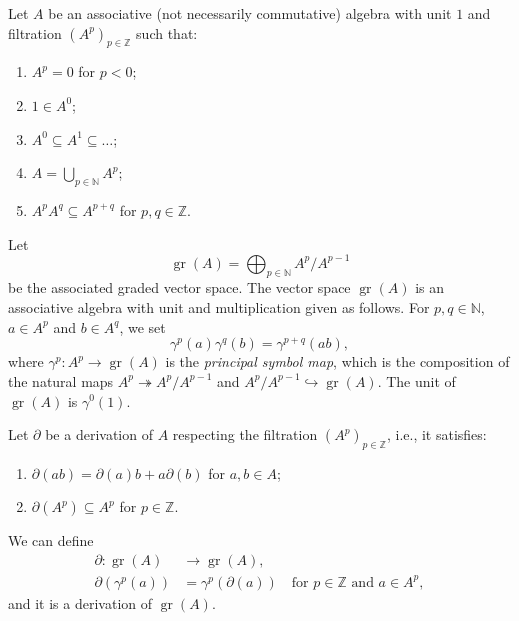 \documentclass[a4paper, 12pt, reqno]{amsart}
\theoremstyle{remark}
\DeclareMathOperator{\gr}{gr}
\begin{document}
Let $A$ be an associative (not necessarily commutative) algebra with unit $1$ and filtration $(A^p)_{p \in \mathbb{Z}}$ such that:
\begin{enumerate}
\item $A^p = 0$ for $p < 0$;
\item $1 \in A^0$;
\item $A^0 \subseteq A^1 \subseteq \dots$;
\item $A = \bigcup_{p \in \mathbb{N}}A^p$;
\item $A^pA^q \subseteq A^{p + q}$ for $p, q \in \mathbb{Z}$.
\end{enumerate}
Let
\begin{equation*}
  \gr(A) = \bigoplus_{p \in \mathbb{N}}A^p/A^{p - 1}
\end{equation*}
be the associated graded vector space.
The vector space $\gr(A)$ is an associative algebra with unit and multiplication given as follows.
For $p, q \in \mathbb{N}$, $a \in A^p$ and $b \in A^q$, we set
\begin{equation*}
  \gamma^p(a)\gamma^q(b) = \gamma^{p + q}(ab),
\end{equation*}
where $\gamma^p: A^p \to \gr(A)$ is the \emph{principal symbol map}, which is the composition of the natural maps $A^p \twoheadrightarrow A^p/A^{p - 1}$ and $A^p/A^{p - 1} \hookrightarrow \gr(A)$.
The unit of $\gr(A)$ is $\gamma^0(1)$.

Let $\partial$ be a derivation of $A$ respecting the filtration $(A^p)_{p \in \mathbb{Z}}$, i.e., it satisfies:
\begin{enumerate}
\item $\partial(ab) = \partial(a)b + a\partial(b)$ for $a, b \in A$;
\item $\partial(A^p) \subseteq A^p$ for $p \in \mathbb{Z}$.
\end{enumerate}
We can define
\begin{align*}
  \partial: \gr(A) &\to \gr(A), \\
  \partial(\gamma^p(a)) &= \gamma^p(\partial(a)) \quad \text{for $p \in \mathbb{Z}$ and $a \in A^p$},
\end{align*}
and it is a derivation of $\gr(A)$.
\end{document}
